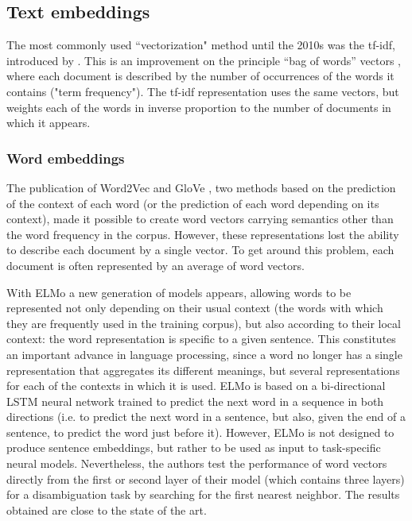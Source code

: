 \subsection{Text embeddings}
\label{Text embeddings}
The most commonly used ``vectorization" method until the 2010s
was the tf-idf, introduced by \citet{sparck_1972_statistical}. This is an improvement on the principle “bag of words” vectors \cite{harris1954distributional}, where each document is described by the
number of occurrences of the words it contains ("term frequency"). The tf-idf representation uses the same vectors, but weights each of the words in inverse proportion to the number of documents in which it appears.

\subsubsection{Word embeddings}

The publication of Word2Vec \citep{mikolov_efficient_2013} and GloVe \citep{pennington2014glove}, two methods based on the prediction of the context of each word (or the prediction of each word depending on its context), made it possible to create word vectors carrying semantics other than the word frequency in the corpus. However, these representations lost the ability to describe each document by a single vector. To get around this problem, each document is often represented by an average of word vectors.

With ELMo \citep{peters2018deep} a new generation of models appears,
allowing words to be represented not only depending on their usual context (the words with which they are frequently used in the training corpus), but also according to their local context: the word representation is specific to a given sentence. This constitutes an important advance in language processing, since a word no longer has a single representation that aggregates its different meanings, but several representations for each of the contexts in which it is used. ELMo is based on a bi-directional LSTM neural network trained to predict the next word in a sequence in both directions (i.e. to predict the next word in a sentence, but also, given the end of a sentence, to predict the word just before it). However, ELMo is not designed to produce sentence embeddings, but rather to be used as input to task-specific neural models. Nevertheless, the authors test the performance of word vectors directly from the first or second layer of their model (which contains three layers) for a disambiguation task by searching for the first nearest neighbor. The results obtained are close to the state of the art.

